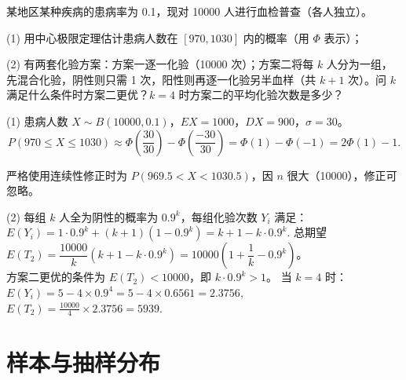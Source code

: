 \documentclass[lang=cn,11pt]{elegantbook}
\begin{document}
\begin{exercise}\label{exer:5-clt-blood}
某地区某种疾病的患病率为 0.1，现对 10000 人进行血检普查（各人独立）。\par
(1) 用中心极限定理估计患病人数在 \([970, 1030]\) 内的概率（用 \(\Phi\) 表示）；\par
(2) 有两套化验方案：方案一逐一化验（10000 次）；方案二将每 \(k\) 人分为一组，先混合化验，阴性则只需 1 次，阳性则再逐一化验另半血样（共 \(k+1\) 次）。问 \(k\) 满足什么条件时方案二更优？\(k = 4\) 时方案二的平均化验次数是多少？
\end{exercise}
\begin{solution}
(1) 患病人数 \(X \sim B(10000, 0.1)\)，\(EX = 1000\)，\(DX = 900\)，\(\sigma = 30\)。
\[
P(970 \leq X \leq 1030) \approx \Phi\!\left(\frac{30}{30}\right) - \Phi\!\left(\frac{-30}{30}\right) = \Phi(1) - \Phi(-1) = 2\Phi(1) - 1.
\]
\begin{note}
严格使用连续性修正时为 \(P(969.5 < X < 1030.5)\)，因 \(n\) 很大（10000），修正可忽略。
\end{note}
(2) 每组 \(k\) 人全为阴性的概率为 \(0.9^k\)，每组化验次数 \(Y_i\) 满足：
\(
E(Y_i) = 1 \cdot 0.9^k + (k+1)(1-0.9^k) = k + 1 - k \cdot 0.9^k.
\)
总期望 \(E(T_2) = \dfrac{10000}{k}(k+1-k \cdot 0.9^k) = 10000\!\left(1 + \dfrac{1}{k} - 0.9^k\right)\)。\\
方案二更优的条件为 \(E(T_2) < 10000\)，即 \(k \cdot 0.9^k > 1\)。
当 \(k = 4\) 时：
\(
E(Y_i) = 5 - 4 \times 0.9^4 = 5 - 4 \times 0.6561 = 2.3756,
\)
\(
E(T_2) = \frac{10000}{4} \times 2.3756 = 5939.
\)
\end{solution}


\chapter{样本与抽样分布}
\end{document}
